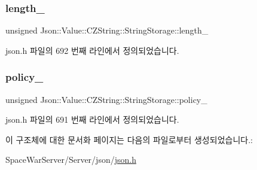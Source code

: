\subsubsection{\texorpdfstring{length\+\_\+}{length\_}}
{\footnotesize\ttfamily unsigned Json\+::\+Value\+::\+C\+Z\+String\+::\+String\+Storage\+::length\+\_\+}



json.\+h 파일의 692 번째 라인에서 정의되었습니다.

\mbox{\label{struct_json_1_1_value_1_1_c_z_string_1_1_string_storage_a7f68c8d6197c5692a525854b5f29f87b}} 
\subsubsection{\texorpdfstring{policy\+\_\+}{policy\_}}
{\footnotesize\ttfamily unsigned Json\+::\+Value\+::\+C\+Z\+String\+::\+String\+Storage\+::policy\+\_\+}



json.\+h 파일의 691 번째 라인에서 정의되었습니다.



이 구조체에 대한 문서화 페이지는 다음의 파일로부터 생성되었습니다.\+:\begin{DoxyCompactItemize}
\item 
Space\+War\+Server/\+Server/json/\hyperlink{json_8h}{json.\+h}\end{DoxyCompactItemize}
